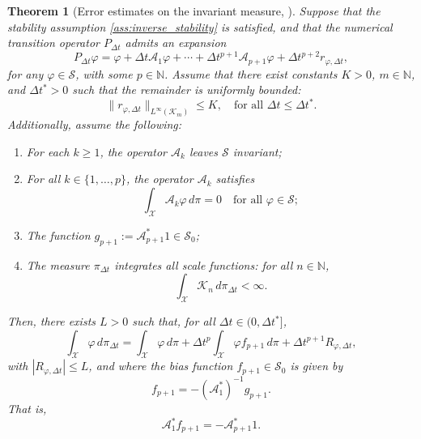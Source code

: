 \documentclass{article}
\newtheorem{theorem}{Theorem}[section]
\begin{document}
\begin{theorem}[Error estimates on the invariant measure, \texorpdfstring{\cite[Theorem~3.3]{Lelievre2016-hx}}{}]
    \label{thm:error-inv-measure}
    Suppose that the stability assumption \ref{ass:inverse_stability} is satisfied, and that the numerical transition operator $P_{\Delta t}$ admits an expansion
    \begin{equation} \label{A_expansion}
        P_{\Delta t} \varphi = \varphi + \Delta t \mathcal{A}_1 \varphi + \cdots + \Delta t^{p+1} \mathcal{A}_{p+1} \varphi + \Delta t^{p+2} r_{\varphi,\Delta t},
    \end{equation}
    for any $\varphi \in \mathcal{S}$, with some $p \in \mathbb{N}$. Assume that there exist constants $K > 0$, $m \in \mathbb{N}$, and $\Delta t^* > 0$ such that the remainder is uniformly bounded:
    \[
    \| r_{\varphi,\Delta t} \|_{L^\infty(\mathcal{K}_m)} \leq K, \quad \text{for all } \Delta t \leq \Delta t^*.
    \]
    Additionally, assume the following:
    \begin{enumerate}
        \item For each $k \geq 1$, the operator $\mathcal{A}_k$ leaves $\mathcal{S}$ invariant;
        \item For all $k \in \{1, \ldots, p\}$, the operator $\mathcal{A}_k$ satisfies
        \begin{equation} \label{Ak_mean_zero}
            \int_\mathcal{X} \mathcal{A}_k \varphi \, d\pi = 0 \quad \text{for all } \varphi \in \mathcal{S};
        \end{equation}
        \item The function $g_{p+1} := \mathcal{A}_{p+1}^* 1 \in \mathcal{S}_0$;
        \item The measure $\pi_{\Delta t}$ integrates all scale functions: for all $n \in \mathbb{N}$,
        \[
        \int_\mathcal{X} \mathcal{K}_n \, d\pi_{\Delta t} < \infty.
        \]
    \end{enumerate}
    Then, there exists $L > 0$ such that, for all $\Delta t \in (0, \Delta t^*]$,
    \begin{equation} \label{bias_error_estimate}
        \int_\mathcal{X} \varphi \, d\pi_{\Delta t} = \int_\mathcal{X} \varphi \, d\pi + \Delta t^p \int_\mathcal{X} \varphi f_{p+1} \, d\pi + \Delta t^{p+1} R_{\varphi,\Delta t},
    \end{equation}
    with $|R_{\varphi,\Delta t}| \leq L$, and where the bias function $f_{p+1} \in \mathcal{S}_0$ is given by
    \[
    f_{p+1} = -(\mathcal{A}_1^*)^{-1} g_{p+1}.
    \]
    That is,
    \[
    \mathcal{A}_1^* f_{p+1} = -\mathcal{A}_{p+1}^* 1.
    \]
\end{theorem}
\end{document}
